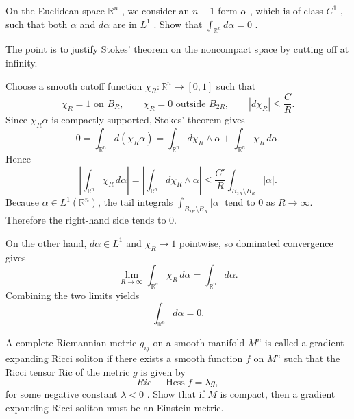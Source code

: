 \begin{exercise}
\label{geometry:2023:5}
On the Euclidean space $\mathbb { R } ^ { n }$ , we consider an $n - 1$ form $\alpha$ , which is of class $C ^ { 1 }$ , such that both $\alpha$ and $d \alpha$ are in $L ^ { 1 }$ . Show that $\int _ { \mathbb { R } ^ { n } } d \alpha = 0$ .
\end{exercise}

\begin{solution}
The point is to justify Stokes' theorem on the noncompact space by cutting off at
infinity.

Choose a smooth cutoff function $\chi_R:\mathbb{R}^n\to[0,1]$ such that
\[
    \chi_R=1 \text{ on } B_R,\qquad
    \chi_R=0 \text{ outside } B_{2R},\qquad
    |d\chi_R|\leq \frac{C}{R}.
\]
Since $\chi_R\alpha$ is compactly supported, Stokes' theorem gives
\[
    0
    =
    \int_{\mathbb{R}^n} d(\chi_R\alpha)
    =
    \int_{\mathbb{R}^n} d\chi_R\wedge\alpha
    +
    \int_{\mathbb{R}^n}\chi_R\,d\alpha.
\]
Hence
\[
    \left|\int_{\mathbb{R}^n}\chi_R\,d\alpha\right|
    =
    \left|\int_{\mathbb{R}^n} d\chi_R\wedge\alpha\right|
    \leq
    \frac{C'}{R}\int_{B_{2R}\setminus B_R}|\alpha|.
\]
Because $\alpha\in L^1(\mathbb{R}^n)$, the tail integrals
$\int_{B_{2R}\setminus B_R}|\alpha|$ tend to $0$ as $R\to\infty$. Therefore the
right-hand side tends to $0$.

On the other hand, $d\alpha\in L^1$ and $\chi_R\to 1$ pointwise, so dominated
convergence gives
\[
    \lim_{R\to\infty}\int_{\mathbb{R}^n}\chi_R\,d\alpha
    =
    \int_{\mathbb{R}^n}d\alpha.
\]
Combining the two limits yields
\[
    \int_{\mathbb{R}^n}d\alpha=0.
\]
\end{solution}

\begin{exercise}
\label{geometry:2023:6}
A complete Riemannian metric $g _ { i j }$ on a smooth manifold $M ^ { n }$ is called a gradient expanding Ricci soliton if there exists a smooth function $f$ on $M ^ { n }$ such that the Ricci tensor Ric of the metric $g$ is given by
$$
R i c + \operatorname {H e s s} f = \lambda g,
$$
for some negative constant $\lambda < 0$ . Show that if $M$ is compact, then a gradient expanding Ricci soliton must be an Einstein metric.
\end{exercise}

